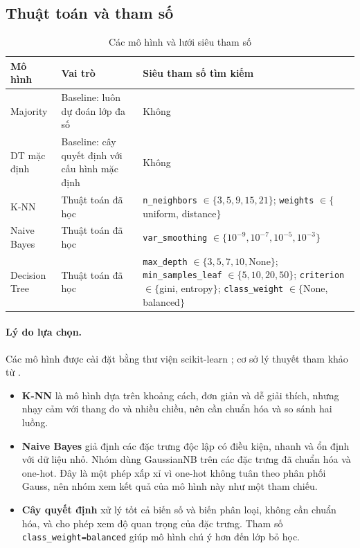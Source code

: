 \documentclass[12pt,a4paper]{article}
\begin{document}
\subsection{Thuật toán và tham số}
\begin{table}[H]
\centering
\caption{Các mô hình và lưới siêu tham số}
\label{tab:models}
\begin{tabular}{p{2.8cm}p{4.2cm}p{6.2cm}}
\toprule
Mô hình & Vai trò & Siêu tham số tìm kiếm \\
\midrule
Majority & Baseline: luôn dự đoán lớp đa số & Không \\
DT mặc định & Baseline: cây quyết định với cấu hình mặc định & Không \\
K-NN & Thuật toán đã học & \texttt{n\_neighbors} $\in\{3,5,9,15,21\}$; \texttt{weights} $\in\{$uniform, distance$\}$ \\
Naive Bayes & Thuật toán đã học & \texttt{var\_smoothing} $\in\{10^{-9},10^{-7},10^{-5},10^{-3}\}$ \\
Decision Tree & Thuật toán đã học & \texttt{max\_depth} $\in\{3,5,7,10,\text{None}\}$; \texttt{min\_samples\_leaf} $\in\{5,10,20,50\}$; \texttt{criterion} $\in\{$gini, entropy$\}$; \texttt{class\_weight} $\in\{$None, balanced$\}$ \\
\bottomrule
\end{tabular}
\end{table}

\paragraph{Lý do lựa chọn.} Các mô hình được cài đặt bằng thư viện scikit-learn \cite{sklearn}; cơ sở lý thuyết tham khảo từ \cite{hastie}.
\begin{itemize}
  \item \textbf{K-NN} là mô hình dựa trên khoảng cách, đơn giản và dễ giải thích, nhưng nhạy cảm với thang đo và nhiều chiều, nên cần chuẩn hóa và so sánh hai luồng.
  \item \textbf{Naive Bayes} giả định các đặc trưng độc lập có điều kiện, nhanh và ổn định với dữ liệu nhỏ. Nhóm dùng GaussianNB trên các đặc trưng đã chuẩn hóa và one-hot. Đây là một phép xấp xỉ vì one-hot không tuân theo phân phối Gauss, nên nhóm xem kết quả của mô hình này như một tham chiếu.
  \item \textbf{Cây quyết định} xử lý tốt cả biến số và biến phân loại, không cần chuẩn hóa, và cho phép xem độ quan trọng của đặc trưng. Tham số \texttt{class\_weight=balanced} giúp mô hình chú ý hơn đến lớp bỏ học.
\end{itemize}
\end{document}
